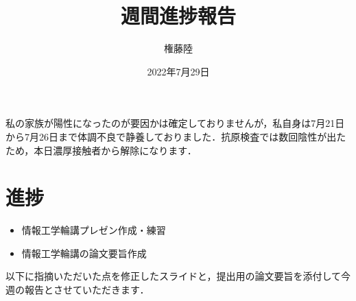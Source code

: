 \documentclass[dvipdfmx]{jsarticle}
\begin{document}
\title{週間進捗報告}
\author{権藤陸}
\date{2022年7月29日}
\maketitle

私の家族が陽性になったのが要因かは確定しておりませんが，私自身は7月21日から7月26日まで体調不良で静養しておりました．抗原検査では数回陰性が出たため，本日濃厚接触者から解除になります．
\section{進捗}
\begin{itemize}
    \item 情報工学輪講プレゼン作成・練習
    \item 情報工学輪講の論文要旨作成
\end{itemize}

以下に指摘いただいた点を修正したスライドと，提出用の論文要旨を添付して今週の報告とさせていただきます．
\end{document}
